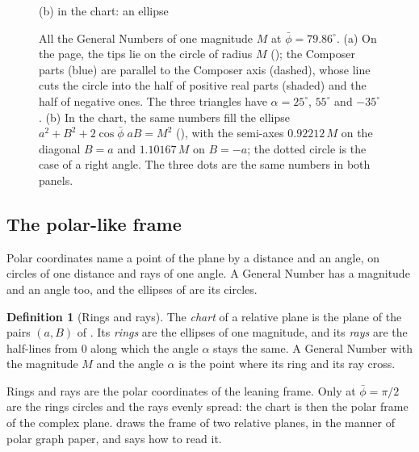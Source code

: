 \documentclass[11pt,a4paper]{amsart}
\theoremstyle{plain}
\theoremstyle{definition}
\newtheorem{definition}[theorem]{Definition}
\theoremstyle{remark}
\newcommand{\pb}{\bar{\phi}}                     %
\begin{document}
\begin{figure}[tb]
\begin{minipage}[b]{0.5\textwidth}
\smallskip
{\small (b) in the chart: an ellipse\par}
\end{minipage}
\caption{All the General Numbers of one magnitude $M$ at $\pb = 79.86^\circ$. (a) On the page, the tips lie on the circle of radius $M$ (); the Composer parts (blue) are parallel to the Composer axis (dashed), whose line cuts the circle into the half of positive real parts (shaded) and the half of negative ones. The three triangles have $\alpha = 25^\circ$, $55^\circ$ and $-35^\circ$. (b) In the chart, the same numbers fill the ellipse $a^2 + B^2 + 2\cos\pb\;aB = M^2$ (), with the semi-axes $0.92212\,M$ on the diagonal $B = a$ and $1.10167\,M$ on $B = -a$; the dotted circle is the case of a right angle. The three dots are the same numbers in both panels.}
\label{fig:magnitude}
\end{figure}

\subsection{The polar-like frame}\label{subsec:polar-frame}

Polar coordinates name a point of the plane by a distance and an angle, on circles of one distance and rays of one angle. A General Number has a magnitude and an angle too, and the ellipses of  are its circles.

\begin{definition}[Rings and rays]\label{def:rings-rays}
The \emph{chart} of a relative plane is the plane of the pairs $(a, B)$ of . Its \emph{rings} are the ellipses of one magnitude, and its \emph{rays} are the half-lines from $0$ along which the angle $\alpha$ stays the same. A General Number with the magnitude $M$ and the angle $\alpha$ is the point where its ring and its ray cross.
\end{definition}

Rings and rays are the polar coordinates of the leaning frame. Only at $\pb = \pi/2$ are the rings circles and the rays evenly spread: the chart is then the polar frame of the complex plane.  draws the frame of two relative planes, in the manner of polar graph paper, and  says how to read it.
\end{document}
